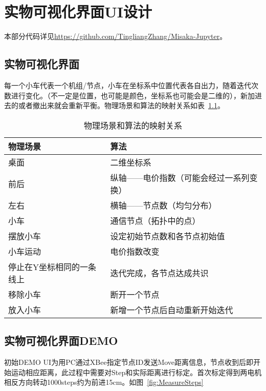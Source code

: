 \chapter{实物可视化界面UI设计}
\label{cha:UI}

本部分代码详见\url{https://github.com/TingliangZhang/Misaka-Jupyter}。

\section{实物可视化界面}

每一个小车代表一个机组/节点，小车在坐标系中位置代表各自出力，随着迭代次数进行变化。（不一定是位置，也可能是颜色，坐标系也可能会是二维的），新加进去的或者撤出来就会重新平衡。物理场景和算法的映射关系如表~\ref{tab:Real-Unreal}。

\begin{table}[htbp]
    \centering
    \begin{tabular}{@{}ll@{}}
    \toprule
    物理场景          & 算法                   \\ \midrule
    桌面            & 二维坐标系                \\
    前后            & 纵轴——电价指数（可能会经过一系列变换） \\
    左右            & 横轴——节点数（均匀分布）        \\
    小车            & 通信节点（拓扑中的点）          \\
    摆放小车          & 设定初始节点数和各节点初始值       \\
    小车运动          & 电价指数改变               \\
    停止在Y坐标相同的一条线上 & 迭代完成，各节点达成共识         \\
    移除小车          & 断开一个节点               \\
    放入小车          & 新增一个节点后自动重新开始迭代      \\ \bottomrule
    \end{tabular}
    \caption{物理场景和算法的映射关系}
    \label{tab:Real-Unreal}
\end{table}

\section{实物可视化界面DEMO}

初始DEMO UI为用PC通过XBee指定节点ID发送Move距离信息，节点收到后即开始运动相应距离，此过程中需要对Step和实际距离进行标定。首次标定得到两电机相反方向转动1000steps约为前进15cm。如图~\ref{fig:MeasureSteps}

